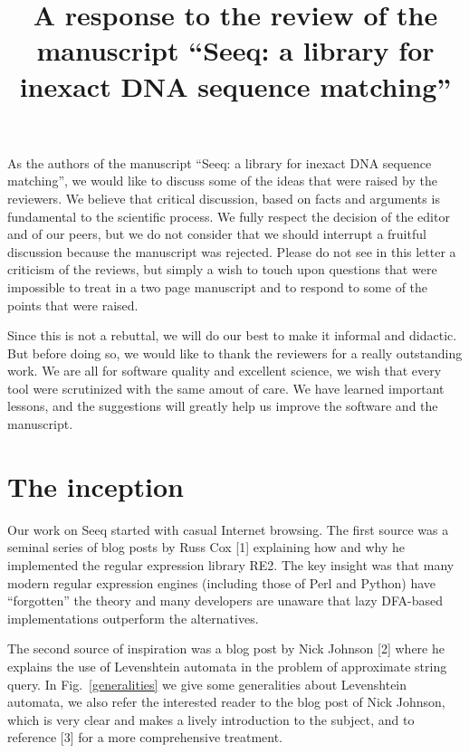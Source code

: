 \documentclass[12pt]{article}
\title{A response to the review of the manuscript
``Seeq: a library for inexact DNA sequence matching''}
\date{}
\begin{document}
\maketitle
As the authors of the manuscript ``Seeq: a library for inexact
DNA sequence matching'', we would like to discuss some of the
ideas that were raised by the reviewers. We believe that
critical discussion, based on facts and arguments is fundamental
to the scientific process. We fully respect the decision of the
editor and of our peers, but we do not consider that we should
interrupt a fruitful discussion because the manuscript was
rejected. Please do not see in this letter a criticism of the
reviews, but simply a wish to touch upon questions that were
impossible to treat in a two page manuscript and to respond to
some of the points that were raised.

Since this is not a rebuttal, we will do our best to make it
informal and didactic. But before doing so, we would like to
thank the reviewers for a really outstanding work. We are
all for software quality and excellent science, we wish that every
tool were scrutinized with the same amout of care. We have learned
important lessons, and the suggestions will greatly help us improve
the software and the manuscript.

\section{The inception}

Our work on Seeq started with casual Internet browsing.
The first source was a seminal series of blog posts by Russ Cox [1]
explaining how and why he implemented the regular expression library
RE2. The key insight was that many modern regular expression engines
(including those of Perl and Python) have ``forgotten'' the
theory and many developers are unaware that lazy DFA-based
implementations outperform the alternatives.

The second source of inspiration was a blog post by Nick Johnson [2]
where he explains the use of Levenshtein automata in the problem of
approximate string query. In Fig.~\ref{generalities} we give some
generalities about Levenshtein automata, we also refer the interested
reader to the blog post of Nick Johnson, which is very clear and makes
a lively introduction to the subject, and to reference [3] for a
more comprehensive treatment.
\end{document}

